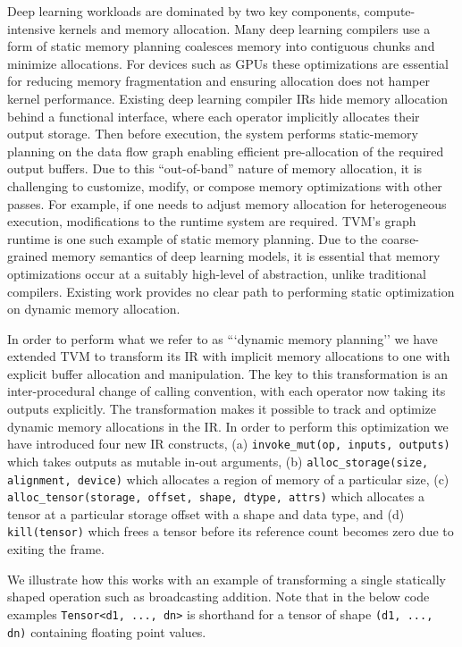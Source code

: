 Deep learning workloads are dominated by two key components,
    compute-intensive kernels and memory allocation.
Many deep learning compilers use a form of static memory planning
    coalesces memory into contiguous chunks and minimize allocations.
For devices such as GPUs these optimizations are essential for
    reducing memory fragmentation and ensuring allocation does not hamper kernel performance.
Existing deep learning compiler IRs hide memory allocation behind a
    functional interface, where each operator implicitly allocates their output storage.
Then before execution, the system performs static-memory planning on the data
    flow graph enabling efficient pre-allocation of the required output buffers.
Due to this ``out-of-band'' nature of memory allocation,
    it is challenging to customize, modify, or compose memory optimizations with other passes.
For example, if one needs to adjust memory allocation for heterogeneous execution,
    modifications to the runtime system are required.
TVM's graph runtime is one such example of static memory planning.
Due to the coarse-grained memory semantics of deep learning models,
    it is essential that memory optimizations occur at a suitably high-level of abstraction,
    unlike traditional compilers.
Existing work provides no clear path to performing static optimization on dynamic memory
    allocation.

In order to perform what we refer to as ```dynamic memory planning'' we have extended
    TVM to transform its IR with implicit memory allocations to one with explicit
    buffer allocation and manipulation.
The key to this transformation is an inter-procedural change of calling convention,
    with each operator now taking its outputs explicitly.
The transformation makes it possible to track and optimize dynamic memory allocations in the IR.
In order to perform this optimization we have introduced four new IR constructs,
    (a) \verb|invoke_mut(op, inputs, outputs)| which takes outputs as mutable in-out arguments,
    (b) \texttt{alloc\_storage(size, alignment, device)} which allocates a region of memory of a particular size,
    (c) \texttt{alloc\_tensor(storage, offset, shape, dtype, attrs)} which allocates a tensor at a particular storage offset with a shape and data type, and
    (d) \verb|kill(tensor)| which frees a tensor before its reference count becomes zero due to exiting the frame.

We illustrate how this works with an example of transforming a single statically shaped operation such as broadcasting addition.
Note that in the below code examples \texttt{Tensor<d1, ..., dn>} is shorthand for a tensor of shape \texttt{(d1, ..., dn)} containing floating point values.

